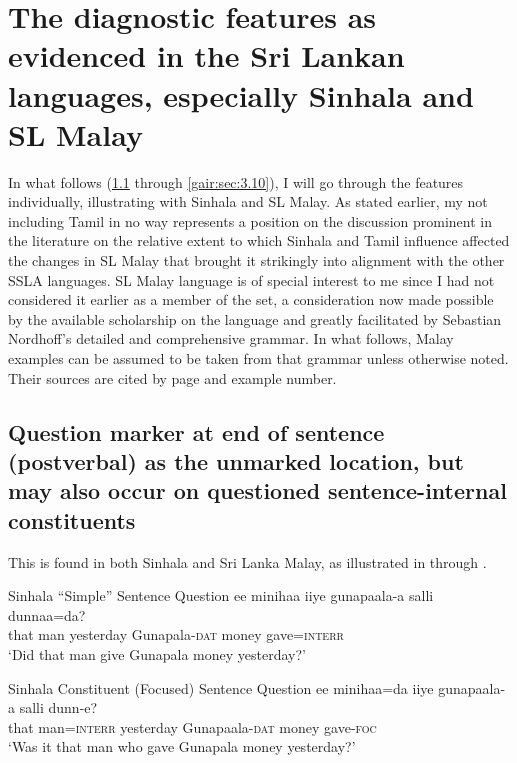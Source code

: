 \section[Instantiation of the features]{The diagnostic features as evidenced in the Sri Lankan languages, especially Sinhala and SL Malay}
In what follows (\ref{gair:sec:3.1} through \ref{gair:sec:3.10}), I will go through the features individually, illustrating with Sinhala and SL Malay. As stated earlier, my not including Tamil in no way represents a position on the discussion prominent in the literature on the relative extent to which Sinhala and Tamil influence affected the changes in SL Malay that brought it strikingly into alignment with the other SSLA languages. SL Malay language is of special interest to me since I had not considered it earlier as a member of the set, a consideration now made possible by the available scholarship on the language and greatly facilitated by Sebastian Nordhoff's detailed and comprehensive grammar. In what follows, Malay examples can be assumed to be taken from that grammar unless otherwise noted.
Their sources are cited by page and example number.

\subsection[Sentence-final question marker]{Question marker at end of sentence (postverbal) as the unmarked location, but may also occur on questioned sentence-internal constituents}\label{gair:sec:3.1} 
This is found in both Sinhala and Sri Lanka Malay, as illustrated in  through . 
 


\ea\label{ex3.1.1}Sinhala ``Simple'' Sentence Question
\gll ee minihaa  iiye  gunapaala-{\dott}a salli  dunnaa=da?\\
  that  man  yesterday Gunapala-\textsc{dat} money gave=\textsc{interr}\\
  `Did that man give Gunapala money yesterday?'
\z



\ea\label{ex3.1.2} Sinhala Constituent (Focused) Sentence Question
\gll  ee minihaa=da  iiye  gunapaala-{\dott}a  salli dunn-e?  \\
 that man=\textsc{interr}  yesterday Gunapaala-\textsc{dat} money gave-\textsc{foc}  \\
 `Was it that man who gave Gunapala money yesterday?'
\z




